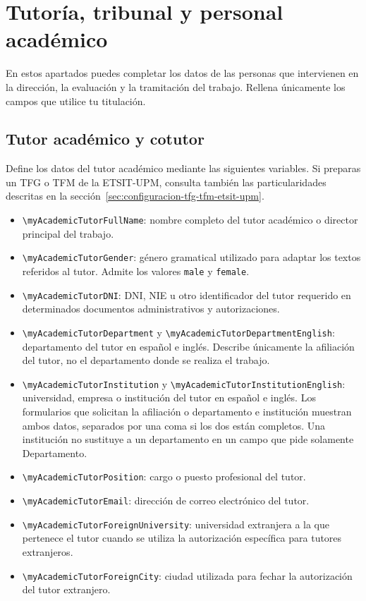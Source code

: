 \section{Tutoría, tribunal y personal académico}

En estos apartados puedes completar los datos de las personas que intervienen en la dirección, la evaluación y la tramitación del trabajo. Rellena únicamente los campos que utilice tu titulación.

\subsection{Tutor académico y cotutor}
\label{sec:tutoria-configuracion}

Define los datos del tutor académico mediante las siguientes variables. Si preparas un TFG o TFM de la ETSIT-UPM, consulta también las particularidades descritas en la sección~\ref{sec:configuracion-tfg-tfm-etsit-upm}.

\begin{itemize}
  \item \texttt{\textbackslash{}myAcademicTutorFullName}: nombre completo del tutor académico o director principal del trabajo.
  \item \texttt{\textbackslash{}myAcademicTutorGender}: género gramatical utilizado para adaptar los textos referidos al tutor. Admite los valores \texttt{male} y \texttt{female}.
  \item \texttt{\textbackslash{}myAcademicTutorDNI}: DNI, NIE u otro identificador del tutor requerido en determinados documentos administrativos y autorizaciones.
  \item \texttt{\textbackslash{}myAcademicTutorDepartment} y \texttt{\textbackslash{}myAcademicTutorDepartmentEnglish}: departamento del tutor en español e inglés. Describe únicamente la afiliación del tutor, no el departamento donde se realiza el trabajo.
  \item \texttt{\textbackslash{}myAcademicTutorInstitution} y \texttt{\textbackslash{}myAcademicTutorInstitutionEnglish}: universidad, empresa o institución del tutor en español e inglés. Los formularios que solicitan la afiliación o departamento e institución muestran ambos datos, separados por una coma si los dos están completos. Una institución no sustituye a un departamento en un campo que pide solamente Departamento.
  \item \texttt{\textbackslash{}myAcademicTutorPosition}: cargo o puesto profesional del tutor.
  \item \texttt{\textbackslash{}myAcademicTutorEmail}: dirección de correo electrónico del tutor.
  \item \texttt{\textbackslash{}myAcademicTutorForeignUniversity}: universidad extranjera a la que pertenece el tutor cuando se utiliza la autorización específica para tutores extranjeros.
  \item \texttt{\textbackslash{}myAcademicTutorForeignCity}: ciudad utilizada para fechar la autorización del tutor extranjero.
\end{itemize}

